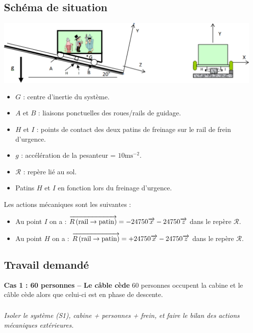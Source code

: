 \documentclass[10pt,fleqn]{book} %
\begin{document}
\begin{multicols}{2}
\subsection*{Schéma de situation}
\begin{center}
\includegraphics[width=\linewidth]{images/fig_07}
\end{center}

\begin{itemize}
\item $G$ : centre d’inertie du système.
\item $A$ et $B$ : liaisons ponctuelles des roues/rails de guidage.
\item $H$ et $I$ : points de contact des deux patins de freinage sur le rail de frein d’urgence.
\item $g$ : accélération de la pesanteur = $10 \text{ms}^{-2}$.
\item $\mathcal{R}$ : repère lié au sol.
\item Patins $H$ et $I$ en fonction lors du freinage d’urgence.
\end{itemize}
Les actions mécaniques sont les suivantes :
\begin{itemize}
\item Au point $I$ on a : $\overrightarrow{R\left( {\text{rail}} \rightarrow {\text{patin}}\right)} = -24750 \overrightarrow{x}  -24750 \overrightarrow{z}$ dans le repère $\mathcal{R}$. 
\item Au point $H$ on a : $\overrightarrow{R\left( {\text{rail}} \rightarrow {\text{patin}}\right)} = +24750 \overrightarrow{x}  -24750 \overrightarrow{z}$ dans le repère $\mathcal{R}$.
\end{itemize}

\subsection*{Travail demandé}

\textbf{Cas 1 : 60 personnes -- Le câble cède}
60 personnes occupent la cabine et le câble cède alors que celui-ci est en phase de descente. 
\begin{obj}

\end{obj}

\subparagraph{}
\textit{Isoler le système (S1), cabine + personnes + frein, et faire le bilan des actions mécaniques extérieures.}
\ifprof
\begin{corrige}


\end{corrige}
\end{multicols}
\end{document}
